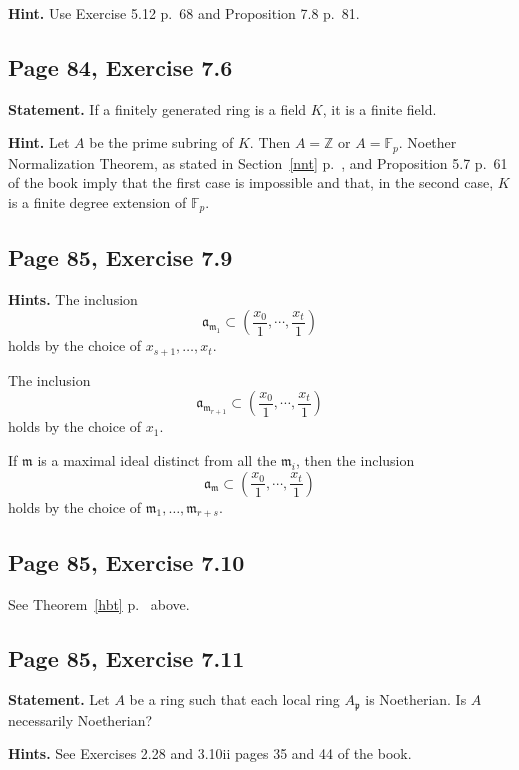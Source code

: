 \documentclass[parskip=half,fontsize=12pt]{scrartcl}%
\newcommand{\mf}{\mathfrak}
\newcommand{\aaa}{\mf a}
\newcommand{\mmm}{\mf m}
\newcommand{\ppp}{\mf p}
\begin{document}
\textbf{Hint.} Use Exercise 5.12 p.~68 and Proposition 7.8 p.~81.

\subsection{Page 84, Exercise 7.6}%

\textbf{Statement.} If a finitely generated ring is a field $K$, it is a finite field.

\textbf{Hint.} Let $A$ be the prime subring of $K$. Then $A=\mathbb Z$ or $A=\mathbb F_p$. Noether Normalization Theorem, as stated in Section~\ref{nnt} p.~\pageref{nnt}, and Proposition 5.7 p.~61 of the book imply that the first case is impossible and that, in the second case, $K$ is a finite degree extension of $\mathbb F_p$. %

\subsection{Page 85, Exercise 7.9}%

\textbf{Hints.} The inclusion 
$$
\aaa_{\mmm_1}\subset\left(\frac{x_0}1,\cdots,\frac{x_t}1\right)
$$ 
holds by the choice of $x_{s+1},\ldots,x_t$. 

The inclusion 
$$
\aaa_{\mmm_{r+1}}\subset\left(\frac{x_0}1,\cdots,\frac{x_t}1\right)
$$ 
holds by the choice of $x_1$. 

If $\mmm$ is a maximal ideal distinct from all the $\mmm_i$, then the inclusion 
$$
\aaa_\mmm\subset\left(\frac{x_0}1,\cdots,\frac{x_t}1\right)
$$ 
holds by the choice of $\mmm_1,\ldots,\mmm_{r+s}$.

\subsection{Page 85, Exercise 7.10}%

See Theorem~\ref{hbt} p.~\pageref{hbt} above.

\subsection{Page 85, Exercise 7.11}%

\textbf{Statement.} Let $A$ be a ring such that each local ring $A_\ppp$ is Noetherian. Is $A$ necessarily Noetherian?

\textbf{Hints.} See Exercises 2.28 and 3.10ii pages 35 and 44 of the book.
\end{document}
